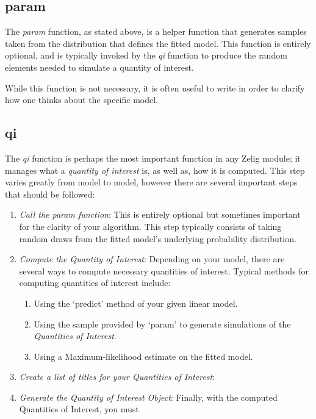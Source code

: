 \subsection{param}

The \emph{param} function, as stated above, is a helper function that generates samples taken from the distribution that defines the fitted model.  This function is entirely optional, and is typically invoked by the \emph{qi} function to produce the random elements needed to simulate a quantity of interest.

While this function is not necessary, it is often useful to write in order to clarify how one thinks about the specific model.

\subsection{qi}

The \emph{qi} function is perhaps the most important function in any Zelig module; it manages what a \emph{quantity of interest} is, as well as, how it is computed.  This step varies greatly from model to model, however there are several important steps that should be followed:

\begin{enumerate}
	\item{\emph{Call the param function}:  This is entirely optional but sometimes important for the clarity of your algorithm.  This step typically consists of taking random draws from the fitted model's underlying probability distribution.}
	\item{\emph{Compute the Quantity of Interest}: Depending on your model, there are several ways to compute necessary quantities of interest.  Typical methods for computing quantities of interest include:
		\begin{enumerate}
			\item{Using the `predict' method of your given linear model.}
			\item{Using the sample provided by `param' to generate simulations of the \emph{Quantities of Interest}.}
			\item{Using a Maximum-likelihood estimate on the fitted model.}
		\end{enumerate}}
	\item{\emph{Create a list of titles for your Quantities of Interest}:}
	\item{\emph{Generate the Quantity of Interest Object}: Finally, with the computed Quantities of Interest, you must }
\end{enumerate}


